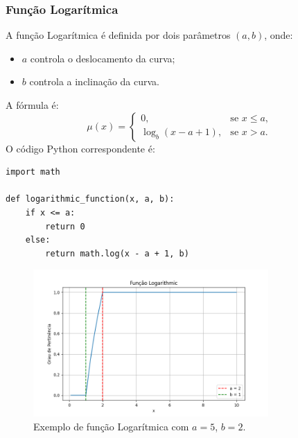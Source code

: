 \documentclass[a4paper,12pt]{article}
\begin{document}
\subsubsection{Função Logarítmica}
A função Logarítmica é definida por dois parâmetros $(a, b)$, onde:
\begin{itemize}
    \item $a$ controla o deslocamento da curva;
    \item $b$ controla a inclinação da curva.
\end{itemize}
A fórmula é:
\[
\mu(x) = 
\begin{cases}
0, & \text{se } x \leq a, \\
\log_b(x - a + 1), & \text{se } x > a.
\end{cases}
\]
O código Python correspondente é:
\begin{verbatim}
import math

def logarithmic_function(x, a, b):
    if x <= a:
        return 0
    else:
        return math.log(x - a + 1, b)
\end{verbatim}
\begin{figure}[H]
    \centering
    \includegraphics[width=0.8\textwidth]{img/logarithmic.png}
    \caption{Exemplo de função Logarítmica com $a=5$, $b=2$.}
\end{figure}
\end{document}
